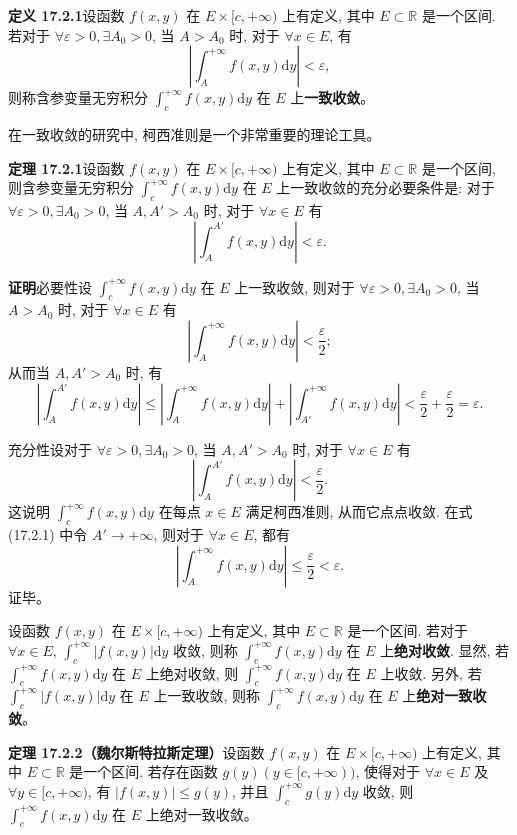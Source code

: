 \documentclass[UTF8,12pt,a4paper,fontset=fandol]{ctexart}
\begin{document}
\noindent\textbf{定义 17.2.1}\quad 设函数 $f(x,y)$ 在 $E\times[c,+\infty)$ 上有定义, 其中 $E\subset\mathbb R$ 是一个区间. 若对于 $\forall\varepsilon>0,\exists A_0>0$, 当 $A>A_0$ 时, 对于 $\forall x\in E$, 有
\[
  \left|\int_A^{+\infty}f(x,y)\mathrm dy\right|<\varepsilon,
\]
则称含参变量无穷积分 $\int_c^{+\infty}f(x,y)\mathrm dy$ 在 $E$ 上\textbf{一致收敛}。

在一致收敛的研究中, 柯西准则是一个非常重要的理论工具。

\noindent\textbf{定理 17.2.1}\quad 设函数 $f(x,y)$ 在 $E\times[c,+\infty)$ 上有定义, 其中 $E\subset\mathbb R$ 是一个区间, 则含参变量无穷积分 $\int_c^{+\infty}f(x,y)\mathrm dy$ 在 $E$ 上一致收敛的充分必要条件是: 对于 $\forall\varepsilon>0,\exists A_0>0$, 当 $A,A'>A_0$ 时, 对于 $\forall x\in E$ 有
\[
  \left|\int_A^{A'}f(x,y)\mathrm dy\right|<\varepsilon.
\]

\noindent\textbf{证明}\quad 必要性\quad 设 $\int_c^{+\infty}f(x,y)\mathrm dy$ 在 $E$ 上一致收敛, 则对于 $\forall\varepsilon>0,\exists A_0>0$, 当 $A>A_0$ 时, 对于 $\forall x\in E$ 有
\[
  \left|\int_A^{+\infty}f(x,y)\mathrm dy\right|<\frac{\varepsilon}{2};
\]
从而当 $A,A'>A_0$ 时, 有
\[
  \left|\int_A^{A'}f(x,y)\mathrm dy\right|
  \leqslant\left|\int_A^{+\infty}f(x,y)\mathrm dy\right|
    +\left|\int_{A'}^{+\infty}f(x,y)\mathrm dy\right|
  <\frac{\varepsilon}{2}+\frac{\varepsilon}{2}=\varepsilon.
\]

充分性\quad 设对于 $\forall\varepsilon>0,\exists A_0>0$, 当 $A,A'>A_0$ 时, 对于 $\forall x\in E$ 有
\[
  \left|\int_A^{A'}f(x,y)\mathrm dy\right|<\frac{\varepsilon}{2}.
  \tag{17.2.1}
\]
这说明 $\int_c^{+\infty}f(x,y)\mathrm dy$ 在每点 $x\in E$ 满足柯西准则, 从而它点点收敛. 在式 (17.2.1) 中令 $A'\to+\infty$, 则对于 $\forall x\in E$, 都有
\[
  \left|\int_A^{+\infty}f(x,y)\mathrm dy\right|\leqslant\frac{\varepsilon}{2}<\varepsilon.
\]
证毕。

设函数 $f(x,y)$ 在 $E\times[c,+\infty)$ 上有定义, 其中 $E\subset\mathbb R$ 是一个区间. 若对于 $\forall x\in E$, $\int_c^{+\infty}|f(x,y)|\mathrm dy$ 收敛, 则称 $\int_c^{+\infty}f(x,y)\mathrm dy$ 在 $E$ 上\textbf{绝对收敛}. 显然, 若 $\int_c^{+\infty}f(x,y)\mathrm dy$ 在 $E$ 上绝对收敛, 则 $\int_c^{+\infty}f(x,y)\mathrm dy$ 在 $E$ 上收敛. 另外, 若 $\int_c^{+\infty}|f(x,y)|\mathrm dy$ 在 $E$ 上一致收敛, 则称 $\int_c^{+\infty}f(x,y)\mathrm dy$ 在 $E$ 上\textbf{绝对一致收敛}。

\noindent\textbf{定理 17.2.2（魏尔斯特拉斯定理）}\quad 设函数 $f(x,y)$ 在 $E\times[c,+\infty)$ 上有定义, 其中 $E\subset\mathbb R$ 是一个区间. 若存在函数 $g(y)(y\in[c,+\infty))$, 使得对于 $\forall x\in E$ 及 $\forall y\in[c,+\infty)$, 有 $|f(x,y)|\leqslant g(y)$, 并且 $\int_c^{+\infty}g(y)\mathrm dy$ 收敛, 则 $\int_c^{+\infty}f(x,y)\mathrm dy$ 在 $E$ 上绝对一致收敛。
\end{document}
